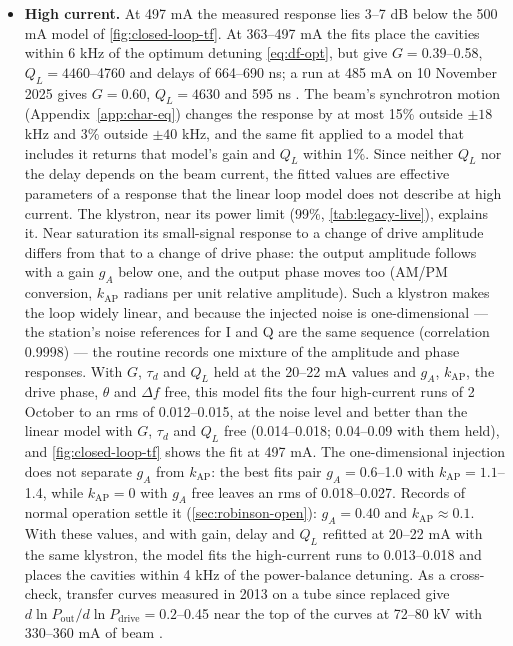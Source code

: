 \begin{itemize}
\item \textbf{High current.} At 497 mA the measured response lies 3--7 dB below the 500 mA model of \cref{fig:closed-loop-tf}. At 363--497 mA the fits place the cavities within 6 kHz of the optimum detuning \eqref{eq:df-opt}, but give \(G = 0.39\)--0.58, \(Q_L = 4460\)--4760 and delays of 664--690 ns; a run at 485 mA on 10 November 2025 gives \(G = 0.60\), \(Q_L = 4630\) and 595 ns . The beam's synchrotron motion (Appendix~\ref{app:char-eq}) changes the response by at most 15\% outside \(\pm 18\) kHz and 3\% outside \(\pm 40\) kHz, and the same fit applied to a model that includes it returns that model's gain and \(Q_L\) within 1\%. Since neither \(Q_L\) nor the delay depends on the beam current, the fitted values are effective parameters of a response that the linear loop model does not describe at high current. The klystron, near its power limit (99\%, \cref{tab:legacy-live}), explains it. Near saturation its small-signal response to a change of drive amplitude differs from that to a change of drive phase: the output amplitude follows with a gain \(g_A\) below one, and the output phase moves too (AM/PM conversion, \(k_\text{AP}\) radians per unit relative amplitude). Such a klystron makes the loop widely linear, and because the injected noise is one-dimensional --- the station's noise references for I and Q are the same sequence (correlation 0.9998) --- the routine records one mixture of the amplitude and phase responses. With \(G\), \(\tau_d\) and \(Q_L\) held at the 20--22 mA values and \(g_A\), \(k_\text{AP}\), the drive phase, \(\theta\) and \(\Delta f\) free, this model fits the four high-current runs of 2 October to an rms of 0.012--0.015, at the noise level and better than the linear model with \(G\), \(\tau_d\) and \(Q_L\) free (0.014--0.018; 0.04--0.09 with them held), and \cref{fig:closed-loop-tf} shows the fit at 497 mA. The one-dimensional injection does not separate \(g_A\) from \(k_\text{AP}\): the best fits pair \(g_A = 0.6\)--1.0 with \(k_\text{AP} = 1.1\)--1.4, while \(k_\text{AP} = 0\) with \(g_A\) free leaves an rms of 0.018--0.027. Records of normal operation settle it (\cref{sec:robinson-open}): \(g_A = 0.40\) and \(k_\text{AP} \approx 0.1\). With these values, and with gain, delay and \(Q_L\) refitted at 20--22 mA with the same klystron, the model fits the high-current runs to 0.013--0.018 and places the cavities within 4 kHz of the power-balance detuning. As a cross-check, transfer curves measured in 2013 on a tube since replaced give \(d\ln P_\text{out}/d\ln P_\text{drive} = 0.2\)--0.45 near the top of the curves at 72--80 kV with 330--360 mA of beam .

\end{itemize}
